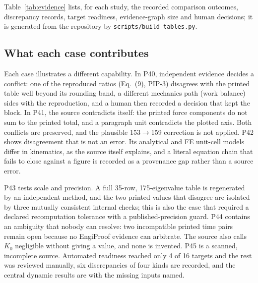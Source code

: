 Table~\ref{tab:evidence} lists, for each study, the recorded comparison outcomes, discrepancy records, target readiness, evidence-graph size and human decisions; it is generated from the repository by \texttt{scripts/build\_tables.py}.

\begin{table}[htbp]
\centering
\caption{Per-study evidence records, generated from the study manifests, ingestion summaries, evidence graphs and decision logs. Comparison outcomes: reproduced, compared, conditional, blocked. Ready: selected targets whose automated readiness gate opened, over targets selected (\S\ref{sec:ingestion}). Decisions: A = , D = .}
\label{tab:evidence}
\scriptsize\setlength{\tabcolsep}{3pt}

\end{table}

\subsection{What each case contributes}
Each case illustrates a different capability. In P40, independent evidence decides a conflict: one of the reproduced ratios (Eq.~(9), PIP-3) disagrees with the printed table well beyond its rounding band, a different mechanics path (work balance) sides with the reproduction, and a human then recorded a  decision that kept the block. In P41, the source contradicts itself: the printed force components do not sum to the printed total, and a paragraph unit contradicts the plotted axis. Both conflicts are preserved, and the plausible 153$\to$159 correction is not applied. P42 shows disagreement that is not an error. Its analytical and FE unit-cell models differ in kinematics, as the source itself explains, and a literal equation chain that fails to close against a figure is recorded as a provenance gap rather than a source error.

P43 tests scale and precision. A full 35-row, 175-eigenvalue table is regenerated by an independent method, and the two printed values that disagree are isolated by three mutually consistent internal checks; this is also the case that required a declared recomputation tolerance with a published-precision guard. P44 contains an ambiguity that nobody can resolve: two incompatible printed time pairs remain open because no EngiProof evidence can arbitrate. The source also calls $K_0$ negligible without giving a value, and none is invented. P45 is a scanned, incomplete source. Automated readiness reached only 4 of 16 targets and the rest was reviewed manually, six discrepancies of four kinds are recorded, and the central dynamic results are  with the missing inputs named.


